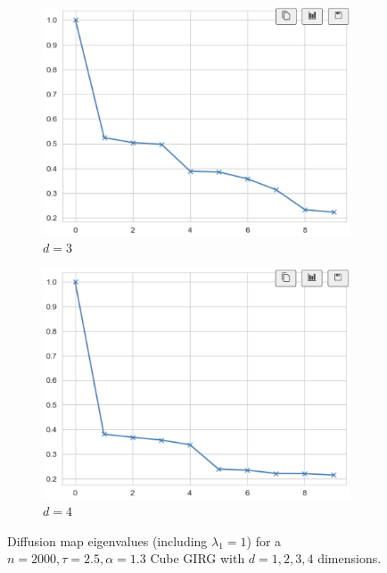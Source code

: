 \begin{figure}
    \begin{subfigure}{0.45\textwidth}
      \centering
      \includegraphics[width=\linewidth]{figures/diffmap_3d.png}
      \caption{$d=3$}
    \end{subfigure}
    \hfill
    \begin{subfigure}{0.45\textwidth}
      \centering
      \includegraphics[width=\linewidth]{figures/diffmap_4d.png}
      \caption{$d=4$}
      \label{fig:cube_diffmaps_d4}
    \end{subfigure}
  
    \caption{Diffusion map eigenvalues (including $\lambda_1 = 1$) for a $n=2000, \tau=2.5, \alpha=1.3$ Cube GIRG with $d=1,2,3,4$ dimensions.}
    \label{fig:cube_diffmaps_d1to4}
\end{figure}

